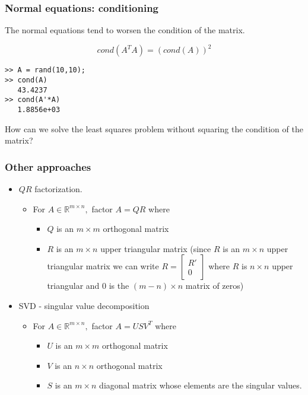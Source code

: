 \documentclass[10pt]{beamer}
\begin{document}
\begin{frame}[fragile]
\frametitle{Normal equations: conditioning}
The normal equations tend to worsen the condition of the matrix. 

\bigskip

\begin{theorem}
$$cond(A^TA) = (cond(A))^2$$
\end{theorem}
\bigskip

\begin{lstlisting}
>> A = rand(10,10);
>> cond(A)
   43.4237
>> cond(A'*A)
   1.8856e+03
\end{lstlisting}

\bigskip

How can we solve the least squares problem without squaring the condition of the matrix?

\end{frame}
\begin{frame}
\frametitle{Other approaches}
\begin{itemize}
\item $QR$ factorization.
\begin{itemize}
\item For $A \in \mathbb{R}^{m\times n},$ factor $A = QR$ where 
\begin{itemize}
\item $Q$ is an $m\times m$ orthogonal matrix 
\item $R$  is an $m\times n$ upper triangular matrix (since $R$ is an $m\times n$ upper triangular matrix we can write $R = \begin{bmatrix} R' \\ 0 \end{bmatrix}$ where $R$ is $n\times n$ upper triangular and 0 is the $(m-n) \times n$ matrix of zeros)
\end{itemize}
\end{itemize}

\bigskip

\item SVD - singular value decomposition
\begin{itemize}
\item For $A \in \mathbb{R}^{m\times n},$ factor $A = USV^T$ where 
\begin{itemize}
\item $U$ is an $m\times m$ orthogonal matrix
\item $V$ is an $n\times n$ orthogonal matrix
\item $S$ is an $m\times n$ diagonal matrix whose elements are the singular values.
\end{itemize} 
\end{itemize}
\end{itemize}
\end{frame}
\end{document}

